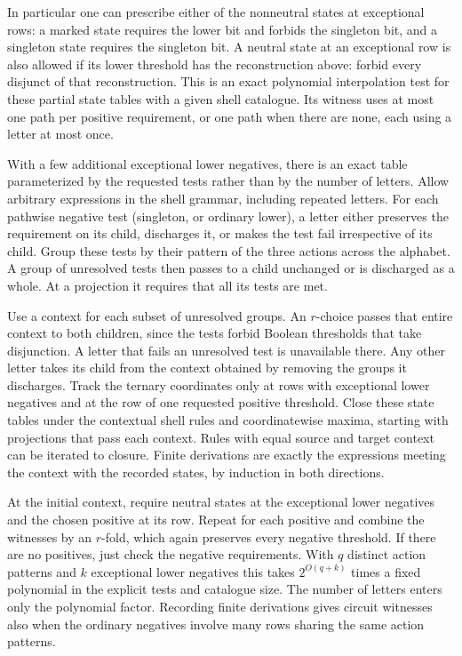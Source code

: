 In particular one can prescribe either of the
nonneutral states at exceptional rows: a marked
state requires the lower bit and forbids the
singleton bit, and a singleton state requires
the singleton bit. A neutral state at an exceptional
row is also allowed if its lower threshold has
the reconstruction above: forbid every disjunct
of that reconstruction. This is an exact
polynomial interpolation test for these partial
state tables with a given shell catalogue. Its
witness uses at most one path per positive
requirement, or one path when there are none,
each using a letter at most once.

With a few additional exceptional lower negatives,
there is an exact table parameterized by the requested
tests rather than by the number of letters. Allow
arbitrary expressions in the shell grammar, including
repeated letters. For each pathwise negative test
(singleton, or ordinary lower), a letter either
preserves the requirement on its child, discharges
it, or makes the test fail irrespective of its
child. Group these tests by their pattern of the
three actions across the alphabet. A group of
unresolved tests then passes to a child unchanged
or is discharged as a whole. At a projection it
requires that all its tests are met.

Use a context for each subset of unresolved groups.
An $r$-choice passes that entire context to both
children, since the tests forbid Boolean thresholds
that take disjunction. A letter that fails an
unresolved test is unavailable there. Any other
letter takes its child from the context obtained
by removing the groups it discharges. Track the
ternary coordinates only at rows with exceptional
lower negatives and at the row of one requested
positive threshold. Close these state tables under
the contextual shell rules and coordinatewise
maxima, starting with projections that pass each
context. Rules with equal source and target context
can be iterated to closure. Finite derivations
are exactly the expressions meeting the context
with the recorded states, by induction in both
directions.

At the initial context, require neutral states
at the exceptional lower negatives and the chosen
positive at its row. Repeat for each positive and
combine the witnesses by an $r$-fold, which again
preserves every negative threshold. If there are
no positives, just check the negative requirements.
With $q$ distinct action patterns and $k$ exceptional
lower negatives this takes $2^{O(q+k)}$ times a fixed
polynomial in the explicit tests and catalogue
size. The number of letters enters only the
polynomial factor. Recording finite derivations
gives circuit witnesses also when the ordinary
negatives involve many rows sharing the same
action patterns.

